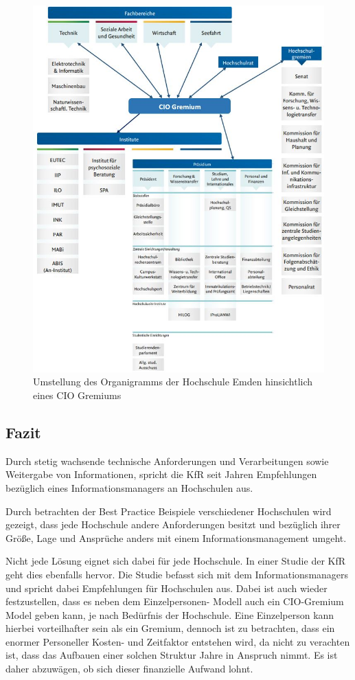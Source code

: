 \begin{figure}
	\centering
	\includegraphics[width=\textwidth]
	{kapitel/gruppe3/bilder/konzept_organigramm_mit_CIO}
	\caption{Umstellung des Organigramms der Hochschule Emden hinsichtlich eines CIO Gremiums}
	\label{fig_konzept_organigramm_mit_CIO}
\end{figure}

\subsection{Fazit}
Durch stetig wachsende technische Anforderungen und Verarbeitungen 
sowie Weitergabe von Informationen, spricht die KfR seit Jahren 
Empfehlungen bezüglich eines Informationsmanagers an Hochschulen aus. 

Durch betrachten der Best Practice Beispiele verschiedener Hochschulen wird gezeigt, 
dass jede Hochschule andere Anforderungen besitzt und bezüglich ihrer Größe, Lage und 
Ansprüche anders mit einem Informationsmanagement umgeht.

Nicht jede Lösung eignet sich dabei für jede Hochschule. 
In einer Studie der KfR geht dies ebenfalls hervor. 
Die Studie befasst sich mit dem Informationsmanagers und spricht dabei Empfehlungen für Hochschulen aus. 
Dabei ist auch wieder festzustellen, dass es neben dem Einzelpersonen- Modell auch ein CIO-Gremium Model geben kann, je nach Bedürfnis der Hochschule. 
Eine Einzelperson kann hierbei vorteilhafter sein als ein Gremium, dennoch ist zu betrachten, dass ein enormer Personeller Kosten- und Zeitfaktor entstehen wird, da nicht zu verachten ist, dass das Aufbauen einer solchen Struktur Jahre in Anspruch nimmt. 
Es ist daher abzuwägen, ob sich dieser finanzielle Aufwand lohnt.

